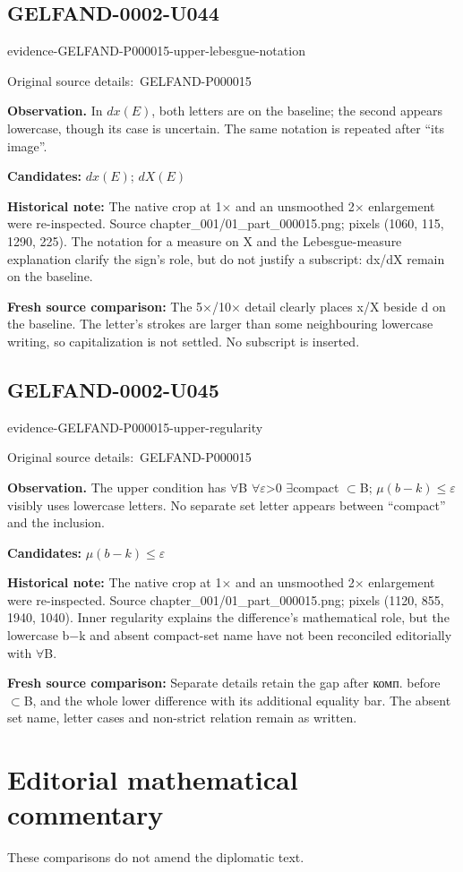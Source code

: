\documentclass[11pt]{article}
\newcommand{\EvidenceBlock}[4]{%
 \par\smallskip\noindent\begin{minipage}{\linewidth}
 \begin{minipage}[t]{.47\linewidth}\vspace{0pt}\centering
 \csname evidence-#1-#2\endcsname\par
 {\scriptsize\SourceCropCaption\ #1}\par
 \end{minipage}\hfill
 \begin{minipage}[t]{.49\linewidth}\vspace{0pt}\raggedright
 {\small\color{orange!65!black}\textbf{#4} #3}\par
 \end{minipage}
 \end{minipage}\par\smallskip}
\newcommand{\SourceCropCaption}{Original source details:}\newcommand{\ReadingCaption}{Uncertain reading.}\newcommand{\IncompleteCaption}{Undeciphered passage.}\newcommand{\DiagramCaption}{Diagram and typed description.}
\begin{document}
\subsection*{GELFAND-0002-U044}
\EvidenceBlock{GELFAND-P000015}{upper-lebesgue-notation}{In \(dx(E)\), both letters are on the baseline; the second appears lowercase, though its case is uncertain. The same notation is repeated after “its image”.}{Observation.}
\par\smallskip\noindent\textbf{Candidates: } \(dx(E)\); \(dX(E)\)\par
\par\smallskip\noindent\textbf{Historical note: } The native crop at 1× and an unsmoothed 2× enlargement were re-inspected. Source chapter\_001/01\_part\_000015.png; pixels (1060, 115, 1290, 225). The notation for a measure on X and the Lebesgue-measure explanation clarify the sign’s role, but do not justify a subscript: dx/dX remain on the baseline.\par
\par\smallskip\noindent\textbf{Fresh source comparison: } The 5×/10× detail clearly places x/X beside d on the baseline. The letter’s strokes are larger than some neighbouring lowercase writing, so capitalization is not settled. No subscript is inserted.\par

\subsection*{GELFAND-0002-U045}
\EvidenceBlock{GELFAND-P000015}{upper-regularity}{The upper condition has \(\forall\)B \(\forall\)\(\varepsilon\)>0 \(\exists\)compact \(\subset\)B; \(\mu(b-k)\leq\varepsilon\) visibly uses lowercase letters. No separate set letter appears between “compact” and the inclusion.}{Observation.}
\par\smallskip\noindent\textbf{Candidates: } \(\mu(b-k)\leq\varepsilon\)\par
\par\smallskip\noindent\textbf{Historical note: } The native crop at 1× and an unsmoothed 2× enlargement were re-inspected. Source chapter\_001/01\_part\_000015.png; pixels (1120, 855, 1940, 1040). Inner regularity explains the difference’s mathematical role, but the lowercase b−k and absent compact-set name have not been reconciled editorially with \(\forall\)B.\par
\par\smallskip\noindent\textbf{Fresh source comparison: } Separate details retain the gap after комп. before \(\subset\)B, and the whole lower difference with its additional equality bar. The absent set name, letter cases and non-strict relation remain as written.\par
\clearpage\section*{Editorial mathematical commentary}
These comparisons do not amend the diplomatic text.
\end{document}
